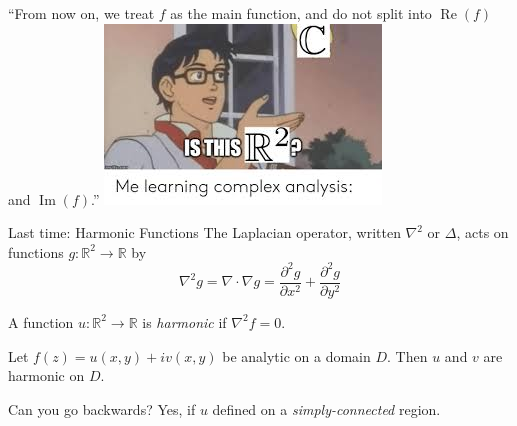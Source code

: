 \documentclass{beamer}
\newcommand{\R}{\mathbb{R}}
\DeclareMathOperator{\Real}{Re}
\DeclareMathOperator{\Imag}{Im}
\begin{document}
\begin{frame}{}
``From now on, we treat $f$ as the main function, and do not split into $\Real(f)$ and $\Imag(f)$.''
\includegraphics[width=\textwidth,height=0.8\textheight,keepaspectratio]{IsThisMeme.jpeg}
\end{frame}

\begin{frame}{Last time: Harmonic Functions}
The Laplacian operator, written $\nabla^2$ or $\Delta$, acts on functions $g:\R^2\to\R$ by
$$\nabla^2g=\nabla\cdot\nabla g=\frac{\partial^2 g}{\partial x^2}+\frac{\partial^2 g}{\partial y^2}$$
\begin{definition}
A function $u:\R^2\to\R$ is \emph{harmonic} if $\nabla^2f=0$.
\end{definition}

\begin{lemma}Let $f(z)=u(x,y)+iv(x,y)$ be analytic on a domain $D$.  Then $u$ and $v$ are harmonic on $D$.
\end{lemma}
\begin{block}{Can you go backwards?}
Yes, if $u$ defined on a \emph{simply-connected} region.  
\end{block}

\end{frame}
\end{document}
